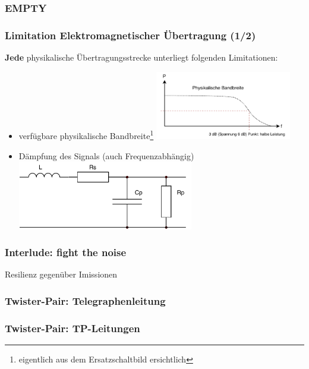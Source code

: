 \documentclass[ignorenonframetext]{beamer}
\begin{document}
\begin{frame}
\frametitle{EMPTY}
\end{frame}









\begin{frame}
\frametitle{Limitation Elektromagnetischer \"Ubertragung (1/2)}
{\bfseries Jede} physikalische \"Ubertragungsstrecke unterliegt folgenden Limitationen:

\begin{itemize}
  \item verf\"ugbare physikalische Bandbreite\footnote{eigentlich aus dem Ersatzschaltbild ersichtlich} \includegraphics[height=3cm]{bandwidth}
  \item D\"ampfung des Signals (auch Frequenzabh\"angig) \includegraphics[height=3cm]{line-circuit}
\end{itemize}
\end{frame}



\begin{frame}
\frametitle{Interlude: fight the noise}
Resilienz gegen\"uber Imissionen
\end{frame}



\begin{frame}
\frametitle{Twister-Pair: Telegraphenleitung}
\end{frame}



\begin{frame}
\frametitle{Twister-Pair: TP-Leitungen}
\end{frame}
\end{document}
